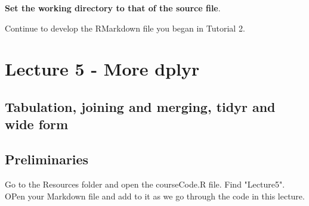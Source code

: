 \documentclass[titlepage]{book}\usepackage{knitr}
\begin{document}
\begin{knitrout}
\color{fgcolor}\begin{kframe}
\begin{alltt}
\hlstd{(}\hlstd{)}
 \hlkwb{<-} 
\end{alltt}
\end{kframe}
\end{knitrout}


\textbf{Set the working directory to that of the source file}.

Continue to develop the RMarkdown file you began in Tutorial 2.













\chapter{Lecture 5 - More dplyr}
\section*{Tabulation, joining and merging, tidyr and wide form}\label{Lecture5}

\author{Brian Williams $<$\href{mailto:bjw649@gmail.com}%
{bjw649@gmail.com}$>$}


\section{Preliminaries}

Go to the Resources folder and open the courseCode.R file.  Find "Lecture5".
OPen your Markdown file and add to it as we go through the code in this lecture.


\begin{knitrout}
\color{fgcolor}\begin{kframe}
\begin{alltt}
\hlstd{(}\hlstd{)}
 \hlkwb{<-} 
\end{alltt}
\end{kframe}
\end{knitrout}
\end{document}
